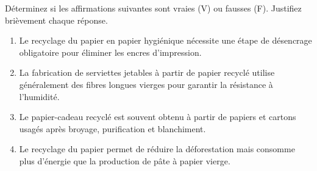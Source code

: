 \documentclass[11pt]{article}
\begin{document}
\begin{exercice}
Déterminez si les affirmations suivantes sont vraies (V) ou fausses (F). Justifiez brièvement chaque réponse.
\begin{enumerate}
    \item Le recyclage du papier en papier hygiénique nécessite une étape de désencrage obligatoire pour éliminer les encres d'impression.
    \item La fabrication de serviettes jetables à partir de papier recyclé utilise généralement des fibres longues vierges pour garantir la résistance à l'humidité.
    \item Le papier-cadeau recyclé est souvent obtenu à partir de papiers et cartons usagés après broyage, purification et blanchiment.
    \item Le recyclage du papier permet de réduire la déforestation mais consomme plus d'énergie que la production de pâte à papier vierge.
\end{enumerate}
\end{exercice}
\end{document}

